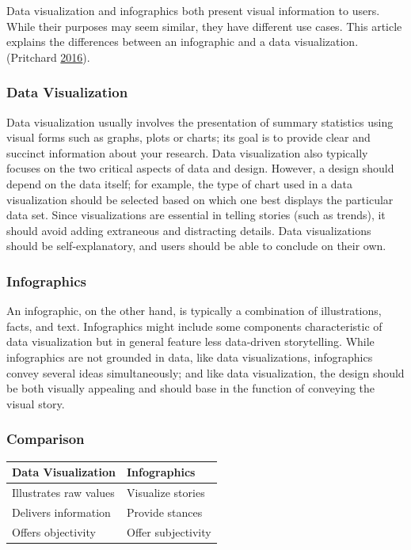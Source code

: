 \documentclass[]{book}
\begin{document}
Data visualization and infographics both present visual information to users. While their purposes may seem similar, they have different use cases. This article explains the differences between an infographic and a data visualization. (Pritchard \protect\hyperlink{ref-VIZVSINFO}{2016}).

\hypertarget{data-visualization}{%
\subsubsection{Data Visualization}\label{data-visualization}}

Data visualization usually involves the presentation of summary statistics using visual forms such as graphs, plots or charts; its goal is to provide clear and succinct information about your research. Data visualization also typically focuses on the two critical aspects of data and design. However, a design should depend on the data itself; for example, the type of chart used in a data visualization should be selected based on which one best displays the particular data set. Since visualizations are essential in telling stories (such as trends), it should avoid adding extraneous and distracting details. Data visualizations should be self-explanatory, and users should be able to conclude on their own.

\hypertarget{infographics}{%
\subsubsection{Infographics}\label{infographics}}

An infographic, on the other hand, is typically a combination of illustrations, facts, and text. Infographics might include some components characteristic of data visualization but in general feature less data-driven storytelling. While infographics are not grounded in data, like data visualizations, infographics convey several ideas simultaneously; and like data visualization, the design should be both visually appealing and should base in the function of conveying the visual story.

\hypertarget{comparison}{%
\subsubsection{Comparison}\label{comparison}}

\begin{longtable}[]{@{}ll@{}}
\toprule
Data Visualization & Infographics\tabularnewline
\midrule
\endhead
Illustrates raw values & Visualize stories\tabularnewline
Delivers information & Provide stances\tabularnewline
Offers objectivity & Offer subjectivity\tabularnewline
\bottomrule
\end{longtable}
\end{document}
